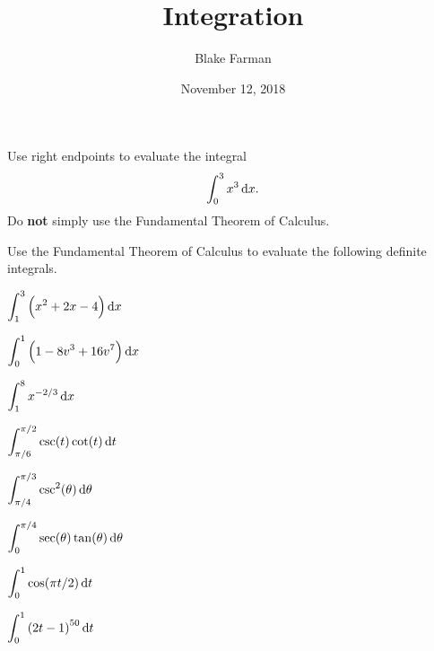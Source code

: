 \documentclass[10pt]{amsart}
\title{Integration}
\date{November 12, 2018}
\author{Blake Farman}
\begin{document}
\maketitle

\makenameslot

\begin{thm}
  Use right endpoints to evaluate the integral
  \[\int_0^3 x^3 \dif x.\]
  Do \textbf{not} simply use the Fundamental Theorem of Calculus.
\end{thm}

\newpage

Use the Fundamental Theorem of Calculus to evaluate the following definite integrals.
\begin{multicols}{2}
  \begin{thm}
    \(\displaystyle{\int_1^3 \left(x^2 + 2x - 4\right)\dif x}\)
  \end{thm}

  \begin{thm}
    \(\displaystyle{\int_0^1 \left(1 - 8v^3 + 16v^7\right) \dif x}\)
  \end{thm}
\end{multicols}

\vspace{2in}

\begin{multicols}{2}
  \begin{thm}
    \(\displaystyle{\int_1^8 x^{-2/3}\dif x}\)
  \end{thm}
  
  \begin{thm}
    \(\displaystyle{\int_{\pi/6}^{\pi/2} \csc(t)\cot(t)\dif t}\)
  \end{thm}
\end{multicols}

\vspace{2in}

\begin{multicols}{2}
  \begin{thm}
    \(\displaystyle{\int_{\pi/4}^{\pi/3} \csc^2(\theta)\dif\theta}\)
  \end{thm}

  \begin{thm}
    \(\displaystyle{\int_0^{\pi/4} \sec(\theta)\tan(\theta)\dif\theta}\)
  \end{thm}
\end{multicols}

\newpage

\begin{multicols}{2}
  \begin{thm}
    \(\displaystyle{\int_0^1\cos(\pi t/2)\dif t}\)
  \end{thm}

  \begin{thm}
    \(\displaystyle{\int_0^1 \left(2t - 1\right)^{50} \dif t}\)
  \end{thm}
\end{multicols}
\end{document}
